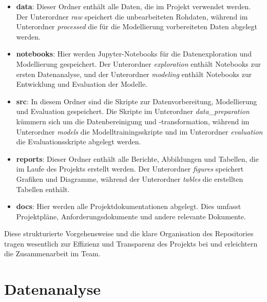 \documentclass[%
pdftex,
oneside,			%
11pt,				%
parskip=half,		%
headheight = 12pt,	%
headsepline,		%
footsepline,		%
footheight = 16pt,	%
abstracton,		%
DIV=calc,		%
BCOR=8mm,		%
headinclude=false,	%
footinclude=false,	%
listof=totoc,		%
toc=bibliography,	%
]{scrreprt}	%
\begin{document}

        \begin{itemize}
            \item \textbf{data}: Dieser Ordner enthält alle Daten, die im Projekt verwendet werden. 
            Der Unterordner \textit{raw} speichert die unbearbeiteten Rohdaten, während im Unterordner \textit{processed} die für die Modellierung vorbereiteten Daten abgelegt werden.
            \item \textbf{notebooks}: Hier werden Jupyter-Notebooks für die Datenexploration und Modellierung gespeichert. 
            Der Unterordner \textit{exploration} enthält Notebooks zur ersten Datenanalyse, und der Unterordner \textit{modeling} enthält Notebooks zur Entwicklung und Evaluation der Modelle.
            \item \textbf{src}: In diesem Ordner sind die Skripte zur Datenvorbereitung, Modellierung und Evaluation gespeichert. 
            Die Skripte im Unterordner \textit{data\_preparation} kümmern sich um die Datenbereinigung und -transformation, während im Unterordner \textit{models} die Modelltrainingsskripte und im Unterordner \textit{evaluation} die Evaluationsskripte abgelegt werden.
            \item \textbf{reports}: Dieser Ordner enthält alle Berichte, Abbildungen und Tabellen, die im Laufe des Projekts erstellt werden. 
            Der Unterordner \textit{figures} speichert Grafiken und Diagramme, während der Unterordner \textit{tables} die erstellten Tabellen enthält.
            \item \textbf{docs}: Hier werden alle Projektdokumentationen abgelegt. 
            Dies umfasst Projektpläne, Anforderungsdokumente und andere relevante Dokumente.
        \end{itemize}

        Diese strukturierte Vorgehensweise und die klare Organisation des Repositories tragen wesentlich zur Effizienz und Transparenz des Projekts bei und erleichtern die Zusammenarbeit im Team.

\chapter{Datenanalyse}
        
\end{document}
